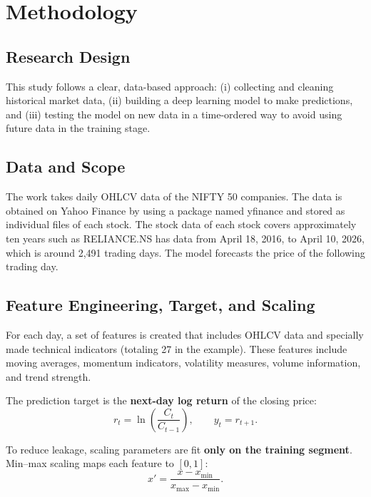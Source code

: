\documentclass[conference]{IEEEtran}
\begin{document}
\section{Methodology}

\subsection{Research Design}

This study follows a clear, data-based approach: (i) collecting and cleaning historical market data, (ii) building a deep learning model to make predictions, and (iii) testing the model on new data in a time-ordered way to avoid using future data in the training stage.

\subsection{Data and Scope}

The work takes daily OHLCV data of the NIFTY 50 companies. The data is obtained on Yahoo Finance by using a package named yfinance and stored as individual files of each stock. The stock data of each stock covers approximately ten years such as RELIANCE.NS has data from April 18, 2016, to April 10, 2026, which is around 2,491 trading days. The model forecasts the price of the following trading day.

\subsection{Feature Engineering, Target, and Scaling}

For each day, a set of features is created that includes OHLCV data and specially made technical indicators (totaling 27 in the example). These features include moving averages, momentum indicators, volatility measures, volume information, and trend strength.

The prediction target is the \textbf{next-day log return} of the closing price:
\begin{equation}
 r_t = \ln\left(\frac{C_t}{C_{t-1}}\right), \qquad y_t = r_{t+1}.
\end{equation}

To reduce leakage, scaling parameters are fit \textbf{only on the training segment}. Min--max scaling maps each feature to $[0,1]$:
\begin{equation}
 x' = \frac{x - x_{\min}}{x_{\max} - x_{\min}}.
\end{equation}
\end{document}
